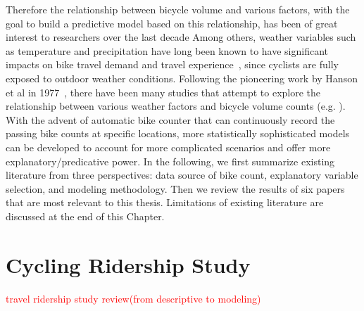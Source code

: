 \documentclass [11pt, proquest] {uwthesis}[2015/03/03]
\begin{document}
Therefore the relationship between bicycle volume and various factors, with the goal to build a predictive model based on this relationship, has been of great interest to researchers over the last decade Among others, weather variables such as temperature and precipitation have long been known to have significant impacts on bike travel demand and travel experience~\cite{Guo07}, since cyclists are fully exposed to outdoor weather conditions. Following the pioneering work by Hanson et al in 1977~\cite{Hanson77}, there have been many studies that attempt to explore the relationship between various weather factors and bicycle volume counts (e.g. \cite{Griswold:2011aa,Fields:2012aa,Niemeier:1996aa,Nosal:2014aa, PeterWeiran16}). With the advent of automatic bike counter that can continuously record the passing bike counts at specific locations, more statistically sophisticated models can be developed to account for more complicated scenarios and offer more explanatory/predicative power. In the following, we first summarize existing literature from three perspectives: data source of bike count, explanatory variable selection, and modeling methodology. Then we review the results of six papers that are most relevant to this thesis. Limitations of existing literature are discussed at the end of this Chapter.



\section{Cycling Ridership Study}

\textcolor{red}{travel ridership study review(from descriptive to modeling)}
\end{document}
